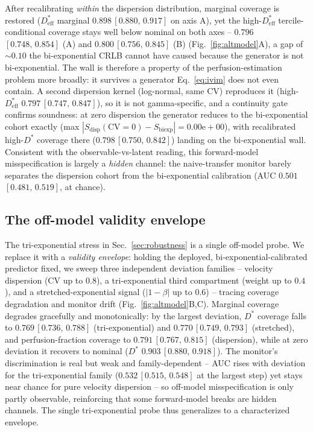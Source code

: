 \documentclass[11pt]{article}
\newcommand{\Dstar}{D^{*}}
\newcommand{\band}[2]{{\scriptsize\,$[#1,\,#2]$}}
\begin{document}
After recalibrating \emph{within} the dispersion distribution, marginal coverage is
restored ($\Dstar_{\mathrm{eff}}$ marginal $0.898$\band{0.880}{0.917} on axis A),
yet the high-$\Dstar_{\mathrm{eff}}$ tercile-conditional coverage stays well below
nominal on both axes -- $0.796$\band{0.748}{0.854} (A) and $0.800$\band{0.756}{0.845}
(B) (Fig.~\ref{fig:altmodel}A), a gap of $\sim0.10$ the bi-exponential CRLB cannot
have caused because the generator is not bi-exponential. The wall is therefore a
property of the perfusion-estimation problem more broadly: it survives a generator
Eq.~\eqref{eq:ivim} does not even contain. A second dispersion kernel (log-normal,
same CV) reproduces it (high-$\Dstar_{\mathrm{eff}}$ $0.797$\band{0.747}{0.847}), so
it is not gamma-specific, and a continuity gate confirms soundness: at zero dispersion
the generator reduces to the bi-exponential cohort exactly (max
$|S_{\mathrm{disp}}(\mathrm{CV}{=}0)-S_{\mathrm{biexp}}|=0.00\mathrm{e}{+}00$), with
recalibrated high-$\Dstar$ coverage there ($0.798$\band{0.750}{0.842}) landing on the
bi-exponential wall. Consistent with the observable-vs-latent reading, this
forward-model misspecification is largely a \emph{hidden} channel: the naive-transfer
monitor barely separates the dispersion cohort from the bi-exponential calibration
(AUC $0.501$\band{0.481}{0.519}, at chance).

\subsection{The off-model validity envelope}
\label{sec:envelope}
The tri-exponential stress in Sec.~\ref{sec:robustness} is a single off-model probe.
We replace it with a \emph{validity envelope}: holding the deployed,
bi-exponential-calibrated predictor fixed, we sweep three independent deviation
families -- velocity dispersion (CV up to $0.8$), a tri-exponential third compartment
(weight up to $0.4$), and a stretched-exponential signal ($|1-\beta|$ up to $0.6$) --
tracing coverage degradation and monitor drift (Fig.~\ref{fig:altmodel}B,C). Marginal
coverage degrades gracefully and monotonically: by the largest deviation, $\Dstar$
coverage falls to $0.769$\band{0.736}{0.788} (tri-exponential) and
$0.770$\band{0.749}{0.793} (stretched), and perfusion-fraction coverage to
$0.791$\band{0.767}{0.815} (dispersion), while at zero deviation it recovers to
nominal ($\Dstar$ $0.903$\band{0.880}{0.918}). The monitor's discrimination is real
but weak and family-dependent -- AUC rises with deviation for the tri-exponential
family ($0.532$\band{0.515}{0.548} at the largest step) yet stays near chance for
pure velocity dispersion -- so off-model misspecification is only partly observable,
reinforcing that some forward-model breaks are hidden channels. The single
tri-exponential probe thus generalizes to a characterized envelope.
\end{document}
